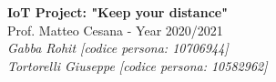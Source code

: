 \documentclass{article}
\begin{document}
\begin{titlepage}
   \begin{center}
      \Huge\textbf{IoT Project: "Keep your distance"}\\
      \vspace{5mm} %
      \Large Prof. Matteo Cesana - Year 2020/2021\\
      \vspace{5mm} %
      \large\textit{Gabba Rohit [codice persona: 10706944]}
      \\
      \large\textit{Tortorelli Giuseppe [codice persona: 10582962]}
   \end{center}
\end{titlepage}
\printindex
\end{document}

